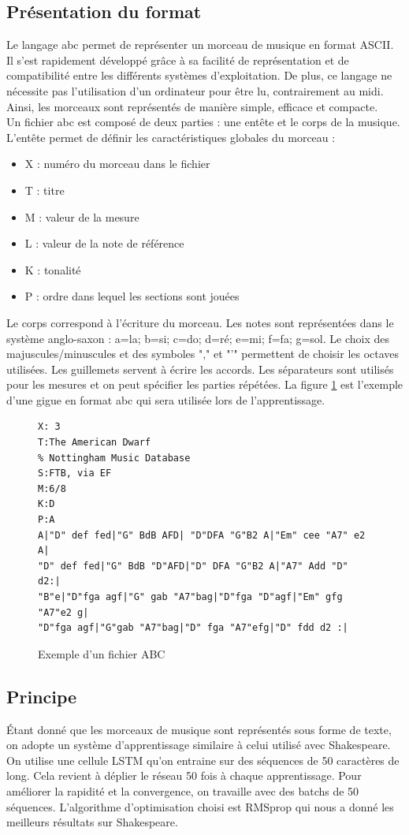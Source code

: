 \subsection{Présentation du format}

Le langage abc permet de représenter un morceau de musique en format ASCII. Il s'est rapidement développé grâce à sa facilité de représentation et de compatibilité entre les différents systèmes d'exploitation. De plus, ce langage ne nécessite pas l'utilisation d'un ordinateur pour être lu, contrairement au midi. Ainsi, les morceaux sont représentés de manière simple, efficace et compacte. \\
Un fichier abc est composé de deux parties : une entête et le corps de la musique.
L'entête permet de définir les caractéristiques globales du morceau :
\begin{itemize}
\item X : numéro du morceau dans le fichier
\item T : titre
\item M : valeur de la mesure
\item L : valeur de la note de référence
\item K : tonalité
\item P : ordre dans lequel les sections sont jouées
\end{itemize}
Le corps correspond à l'écriture du morceau. Les notes sont représentées dans le système anglo-saxon : a=la; b=si; c=do; d=ré; e=mi; f=fa; g=sol. Le choix des majuscules/minuscules et des symboles "," et "'" permettent de choisir les octaves utilisées. Les guillemets servent à écrire les accords. Les séparateurs sont utilisés pour les mesures et on peut spécifier les parties répétées. La figure \ref{fichier_abc_jig_exemple} est l'exemple d'une gigue en format abc qui sera utilisée lors de l'apprentissage. 

\begin{figure}[!h]
\begin{verbatim}
X: 3
T:The American Dwarf
% Nottingham Music Database
S:FTB, via EF
M:6/8
K:D
P:A
A|"D" def fed|"G" BdB AFD| "D"DFA "G"B2 A|"Em" cee "A7" e2 A|
"D" def fed|"G" BdB "D"AFD|"D" DFA "G"B2 A|"A7" Add "D" d2:|
"B"e|"D"fga agf|"G" gab "A7"bag|"D"fga "D"agf|"Em" gfg "A7"e2 g|
"D"fga agf|"G"gab "A7"bag|"D" fga "A7"efg|"D" fdd d2 :|
\end{verbatim}
\caption{Exemple d'un fichier ABC}
\label{fichier_abc_jig_exemple}
\end{figure}

\subsection{Principe}
Étant donné que les morceaux de musique sont représentés sous forme de texte, on adopte un système d'apprentissage similaire à celui utilisé avec Shakespeare. \\
On utilise une cellule LSTM qu'on entraine sur des séquences de 50 caractères de long. Cela revient à déplier le réseau 50 fois à chaque apprentissage. Pour améliorer la rapidité et la convergence, on travaille avec des batchs de 50 séquences. L'algorithme d'optimisation choisi est RMSprop qui nous a donné les meilleurs résultats sur Shakespeare.

